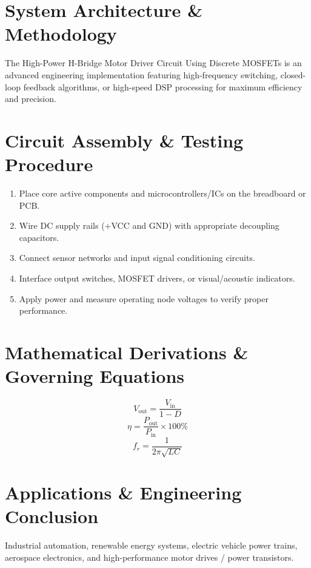 \documentclass[11pt,a4paper]{article}
\begin{document}
\section{System Architecture \& Methodology}
The High-Power H-Bridge Motor Driver Circuit Using Discrete MOSFETs is an advanced engineering implementation featuring high-frequency switching, closed-loop feedback algorithms, or high-speed DSP processing for maximum efficiency and precision.

\section{Circuit Assembly \& Testing Procedure}
\begin{enumerate}
    \item Place core active components and microcontrollers/ICs on the breadboard or PCB.
    \item Wire DC supply rails (+VCC and GND) with appropriate decoupling capacitors.
    \item Connect sensor networks and input signal conditioning circuits.
    \item Interface output switches, MOSFET drivers, or visual/acoustic indicators.
    \item Apply power and measure operating node voltages to verify proper performance.
\end{enumerate}

\section{Mathematical Derivations \& Governing Equations}
\begin{equation}
V_{\text{out}} = \frac{V_{\text{in}}}{1 - D}
\end{equation}
\begin{equation}
\eta = \frac{P_{\text{out}}}{P_{\text{in}}} \times 100\%
\end{equation}
\begin{equation}
f_r = \frac{1}{2\pi \sqrt{L C}}
\end{equation}

\section{Applications \& Engineering Conclusion}
Industrial automation, renewable energy systems, electric vehicle power trains, aerospace electronics, and high-performance motor drives / power transistors.
\end{document}
